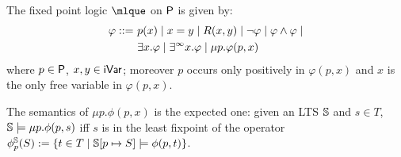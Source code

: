 \begin{definition}
The fixed point logic $\mlque$ on $\mathsf{P}$ is given by:
\begin{align*}
\varphi ::=\ & p(x) \mid x=y \mid R(x,y) \mid \lnot\varphi \mid \varphi \land \varphi \mid\\
& \exists x.\varphi \mid \exists^\infty x.\varphi \mid \mu p.\varphi(p,x)
\end{align*}
%
where $p\in\mathsf{P}$, $x,y\in\mathsf{iVar}$; moreover $p$ occurs only positively in $\varphi(p,x)$ and $x$ is the only free variable in $\varphi(p,x)$.
\end{definition}


The semantics of $\mu p. \phi(p, x)$ is the expected one: given an LTS $\mathbb{S}$ and $s \in T$,  $\mathbb{S} \models \mu p. \phi(p, s)$ iff $s$ is in the least fixpoint of the operator
$\phi^{\mathbb{S}}_p(S) := \{t \in T \mid \mathbb{S}[p \mapsto S] \models \phi(p, t) \}$.%



